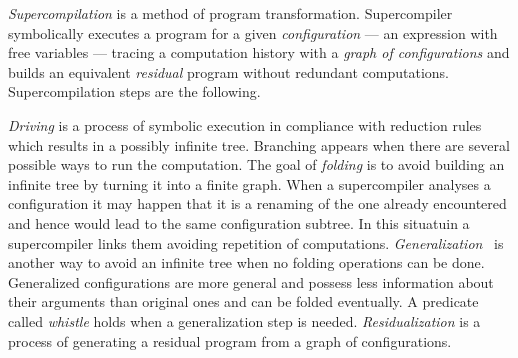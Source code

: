 \documentclass[submission,copyright,creativecommons]{eptcs}
\newcommand{\miniKanren}{\textsc{miniKanren}\ }
\begin{document}

{\it Supercompilation} is a method of program transformation. Supercompiler symbolically
executes a program for a given {\it configuration} --- an expression with free variables ---
tracing a computation history with a {\it graph of configurations} and builds an equivalent {\it residual}
program without redundant computations.
Supercompilation steps are the following.

{\it  Driving} is a process of symbolic execution in compliance with reduction rules which results in a possibly infinite tree.
      Branching appears when there are several possible ways to run the computation.
The goal of {\it folding} is to avoid building an infinite tree by turning it into a finite graph.
      When a supercompiler analyses a configuration it may happen that it is a renaming of the one already encountered and hence
      would lead to the same configuration subtree.
      In this situatuin a supercompiler links them avoiding repetition of computations.
  {\it Generalization}~\cite{generalize} is another way to avoid an infinite tree when no folding operations can be done.
     Generalized configurations are more general and possess less information about their arguments than original ones
	 and can be folded eventually.
     A predicate called {\it whistle} holds when a generalization step is needed.
  {\it Residualization} is a process of generating a residual program from a graph of configurations.


\end{document}
